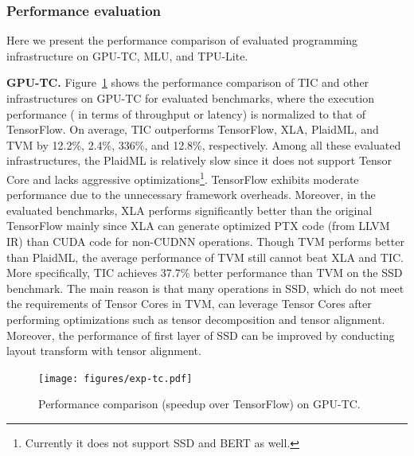 \subsubsection{Performance evaluation}
Here we present the performance comparison of evaluated programming infrastructure on GPU-TC, MLU, and TPU-Lite.

\textbf{GPU-TC.} Figure~\ref{fig:exp-gputc} shows the performance comparison of TIC and other infrastructures on GPU-TC for evaluated benchmarks, where the execution performance ( in terms of throughput or latency) is normalized to that of TensorFlow. On average, TIC outperforms TensorFlow, XLA, PlaidML, and TVM by 12.2\%, 2.4\%, 336\%, and 12.8\%, respectively. Among all these evaluated infrastructures, the PlaidML is relatively slow since it does not support Tensor Core and lacks aggressive optimizations\footnote{Currently it does not support SSD and BERT as well.}. TensorFlow exhibits moderate performance due to the unnecessary framework overheads. Moreover, in the evaluated benchmarks, XLA performs significantly better than the original TensorFlow mainly since XLA can generate optimized PTX code (from LLVM IR) than CUDA code for non-CUDNN operations. Though TVM performs better than PlaidML, the average performance of TVM still cannot beat XLA and TIC. More specifically, TIC achieves 37.7\% better performance than TVM on the SSD benchmark. The main reason is that many operations in SSD, which do not meet the requirements of Tensor Cores in TVM, can leverage Tensor Cores after performing optimizations such as tensor decomposition and tensor alignment. Moreover, the performance of first layer of SSD can be improved by conducting layout transform with tensor alignment.



\begin{figure}
  \centering
\texttt{[image: figures/exp-tc.pdf]}
\vspace{-5pt}
\caption{\footnotesize Performance comparison (speedup over TensorFlow) on GPU-TC.}
\label{fig:exp-gputc}
\vspace{-15pt}
\end{figure}

